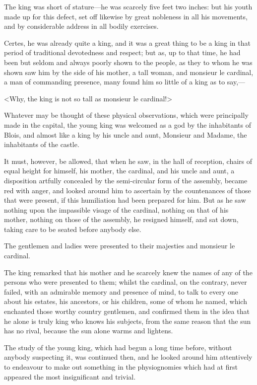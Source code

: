 The king was short of stature—he was scarcely five feet two inches: but his youth made up for this defect, set off likewise by great nobleness in all his movements, and by considerable address in all bodily exercises.

Certes, he was already quite a king, and it was a great thing to be a king in that period of traditional devotedness and respect; but as, up to that time, he had been but seldom and always poorly shown to the people, as they to whom he was shown saw him by the side of his mother, a tall woman, and monsieur le cardinal, a man of commanding presence, many found him so little of a king as to say,—

<Why, the king is not so tall as monsieur le cardinal!>

Whatever may be thought of these physical observations, which were principally made in the capital, the young king was welcomed as a god by the inhabitants of Blois, and almost like a king by his uncle and aunt, Monsieur and Madame, the inhabitants of the castle.

It must, however, be allowed, that when he saw, in the hall of reception, chairs of equal height for himself, his mother, the cardinal, and his uncle and aunt, a disposition artfully concealed by the semi-circular form of the assembly,  became red with anger, and looked around him to ascertain by the countenances of those that were present, if this humiliation had been prepared for him. But as he saw nothing upon the impassible visage of the cardinal, nothing on that of his mother, nothing on those of the assembly, he resigned himself, and sat down, taking care to be seated before anybody else.

The gentlemen and ladies were presented to their majesties and monsieur le cardinal.

The king remarked that his mother and he scarcely knew the names of any of the persons who were presented to them; whilst the cardinal, on the contrary, never failed, with an admirable memory and presence of mind, to talk to every one about his estates, his ancestors, or his children, some of whom he named, which enchanted those worthy country gentlemen, and confirmed them in the idea that he alone is truly king who knows his subjects, from the same reason that the sun has no rival, because the sun alone warms and lightens.

The study of the young king, which had begun a long time before, without anybody suspecting it, was continued then, and he looked around him attentively to endeavour to make out something in the physiognomies which had at first appeared the most insignificant and trivial.

